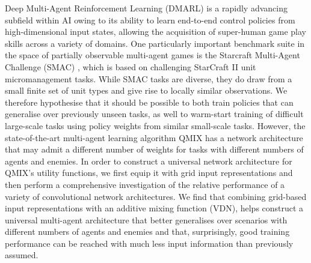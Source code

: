 Deep Multi-Agent Reinforcement Learning (DMARL) is a rapidly advancing subfield within AI owing to its ability to learn end-to-end control policies from high-dimensional input states, allowing the acquisition of super-human game play skills across a variety of domains. One particularly important benchmark suite in the space of partially observable multi-agent games is the Starcraft Multi-Agent Challenge (SMAC) \cite{smac}, which is based on challenging StarCraft II unit micromanagement tasks. 
While SMAC tasks are diverse, they do draw from a small finite set of unit types and give rise to locally similar observations. We therefore hypothesise that it should be possible to both train policies that can generalise over previously unseen tasks, as well to warm-start training of difficult large-scale tasks using policy weights from similar small-scale tasks.
However, the state-of-the-art multi-agent learning algorithm QMIX \cite{qmixcite} has a network architecture that may admit a different number of weights for tasks with different numbers of agents and enemies.  
In order to construct a universal network architecture for QMIX's utility functions, we first equip it with grid input representations and then perform a comprehensive investigation of the relative performance of a variety of convolutional network architectures. We find that combining grid-based input representations with an additive mixing function (VDN), helps construct a universal multi-agent architecture that better generalises over scenarios with different numbers of agents and enemies and that, surprisingly, good training performance can be reached with much less input information than previously assumed.